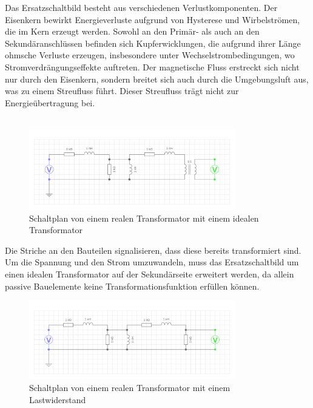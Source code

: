 \begin{enumerate}[label=\alph*)]
        Das Ersatzschaltbild besteht aus verschiedenen Verlustkomponenten. Der Eisenkern bewirkt Energieverluste aufgrund von Hysterese und Wirbelströmen, die im Kern erzeugt werden. Sowohl an den Primär- als auch an den Sekundäranschlüssen befinden sich Kupferwicklungen, die aufgrund ihrer Länge ohmsche Verluste erzeugen, insbesondere unter Wechselstrombedingungen, wo Stromverdrängungseffekte auftreten. Der magnetische Fluss erstreckt sich nicht nur durch den Eisenkern, sondern breitet sich auch durch die Umgebungsluft aus, was zu einem Streufluss führt. Dieser Streufluss trägt nicht zur Energieübertragung bei.\\ \ \\
        \begin{figure}[h!]
          \begin{center}
            \includegraphics[width=0.8\textwidth]{img/2.1.2.2.png}
          \end{center}
          \caption{Schaltplan von einem realen Transformator mit einem idealen Transformator}\label{img/2.1.2.2}
        \end{figure}
        Die Striche an den Bauteilen signalisieren, dass diese bereits transformiert sind. Um die Spannung und den Strom umzuwandeln, muss das Ersatzschaltbild um einen idealen Transformator auf der Sekundärseite erweitert werden, da allein passive Bauelemente keine Transformationsfunktion erfüllen können.\\
        \begin{figure}[h!]
          \begin{center}
            \includegraphics[width=0.8\textwidth]{img/2.1.2.3.png}
          \end{center}
          \caption{Schaltplan von einem realen Transformator mit einem Lastwiderstand}\label{img/2.1.2.3}
        \end{figure}


\end{enumerate}
